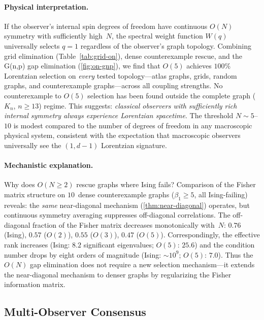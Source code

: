 \documentclass[11pt]{article}
\theoremstyle{definition}
\theoremstyle{remark}
\begin{document}
\paragraph{Physical interpretation.}
If the observer's internal spin degrees of freedom have continuous $O(N)$
symmetry with sufficiently high~$N$, the spectral weight function $W(q)$
universally selects $q = 1$ regardless of the observer's graph topology.
Combining grid elimination (Table~\ref{tab:grid-on}), dense counterexample
rescue, and the G(n,p) gap elimination (\cref{fig:on-gnp}), we find that
$O(5)$ achieves $100\%$ Lorentzian selection on \emph{every} tested
topology---atlas graphs, grids, random graphs, and counterexample
graphs---across all coupling strengths. No counterexample to $O(5)$
selection has been found outside the complete graph ($K_n$, $n \geq 13$)
regime.
This suggests: \emph{classical observers with sufficiently rich internal
symmetry always experience Lorentzian spacetime}. The threshold $N \sim 5$--$10$
is modest compared to the number of degrees of freedom in any macroscopic
physical system, consistent with the expectation that macroscopic observers
universally see the $(1, d{-}1)$ Lorentzian signature.

\paragraph{Mechanistic explanation.}
Why does $O(N \geq 2)$ rescue graphs where Ising fails?
Comparison of the Fisher matrix structure on $10$~dense
counterexample graphs ($\beta_1 \geq 5$, all Ising-failing) reveals:
the \emph{same} near-diagonal mechanism (\cref{thm:near-diagonal})
operates, but continuous symmetry averaging suppresses off-diagonal
correlations. The off-diagonal fraction of the Fisher matrix decreases
monotonically with~$N$: $0.76$ (Ising), $0.57$ ($O(2)$), $0.55$
($O(3)$), $0.47$ ($O(5)$). Correspondingly, the effective rank increases
(Ising: $8.2$ significant eigenvalues; $O(5)$: $25.6$) and the condition
number drops by eight orders of magnitude (Ising: ${\sim}10^9$;
$O(5)$: $7.0$). Thus the $O(N)$ gap elimination does not require
a new selection mechanism---it extends the near-diagonal mechanism to
denser graphs by regularizing the Fisher information matrix.

\subsection{Multi-Observer Consensus}
\label{sec:multi-observer}
\end{document}
